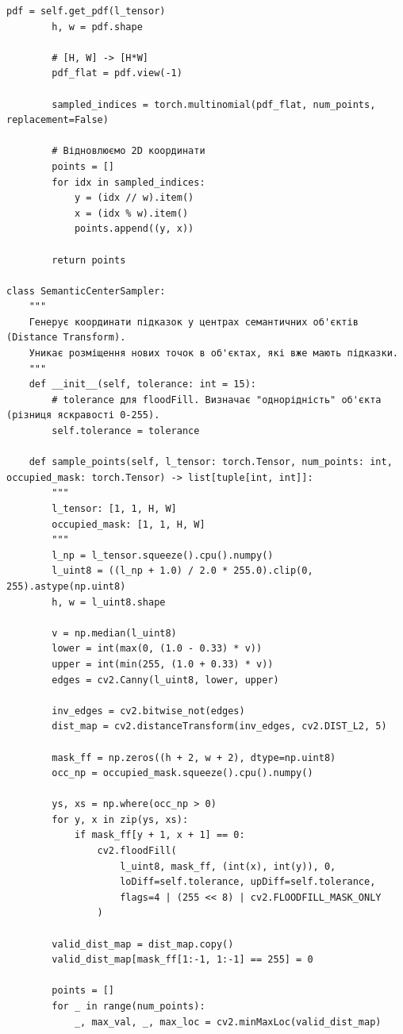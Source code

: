 \begin{lstlisting}[caption={Класи просторового семплювання координат (PyTorch, OpenCV)}]
        pdf = self.get_pdf(l_tensor)
        h, w = pdf.shape
        
        # [H, W] -> [H*W]
        pdf_flat = pdf.view(-1)

        sampled_indices = torch.multinomial(pdf_flat, num_points, replacement=False)
        
        # Відновлюємо 2D координати
        points = []
        for idx in sampled_indices:
            y = (idx // w).item()
            x = (idx % w).item()
            points.append((y, x))
            
        return points

class SemanticCenterSampler:
    """
    Генерує координати підказок у центрах семантичних об'єктів (Distance Transform).
    Уникає розміщення нових точок в об'єктах, які вже мають підказки.
    """
    def __init__(self, tolerance: int = 15):
        # tolerance для floodFill. Визначає "однорідність" об'єкта (різниця яскравості 0-255).
        self.tolerance = tolerance

    def sample_points(self, l_tensor: torch.Tensor, num_points: int, occupied_mask: torch.Tensor) -> list[tuple[int, int]]:
        """
        l_tensor: [1, 1, H, W]
        occupied_mask: [1, 1, H, W]
        """
        l_np = l_tensor.squeeze().cpu().numpy()
        l_uint8 = ((l_np + 1.0) / 2.0 * 255.0).clip(0, 255).astype(np.uint8)
        h, w = l_uint8.shape

        v = np.median(l_uint8)
        lower = int(max(0, (1.0 - 0.33) * v))
        upper = int(min(255, (1.0 + 0.33) * v))
        edges = cv2.Canny(l_uint8, lower, upper)

        inv_edges = cv2.bitwise_not(edges)
        dist_map = cv2.distanceTransform(inv_edges, cv2.DIST_L2, 5)

        mask_ff = np.zeros((h + 2, w + 2), dtype=np.uint8)
        occ_np = occupied_mask.squeeze().cpu().numpy()
        
        ys, xs = np.where(occ_np > 0)
        for y, x in zip(ys, xs):
            if mask_ff[y + 1, x + 1] == 0:
                cv2.floodFill(
                    l_uint8, mask_ff, (int(x), int(y)), 0, 
                    loDiff=self.tolerance, upDiff=self.tolerance, 
                    flags=4 | (255 << 8) | cv2.FLOODFILL_MASK_ONLY
                )
        
        valid_dist_map = dist_map.copy()
        valid_dist_map[mask_ff[1:-1, 1:-1] == 255] = 0

        points = []
        for _ in range(num_points):
            _, max_val, _, max_loc = cv2.minMaxLoc(valid_dist_map)


\end{lstlisting}
